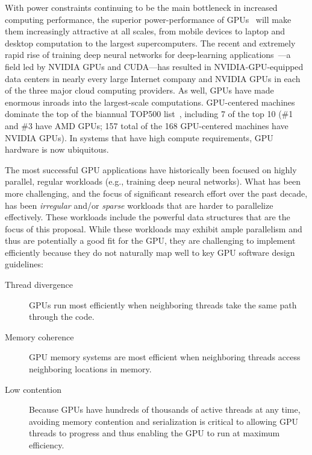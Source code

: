 With power constraints continuing to be the main bottleneck in increased computing performance, the superior power-performance of GPUs~\cite{Dally:2010:GCT} will make them increasingly attractive at all scales, from mobile devices to laptop and desktop computation to the largest supercomputers. The recent and extremely rapid rise of training deep neural networks for deep-learning applications~\cite{Amodei:2015:DS2,Chetlur:2014:CEP,Coates:2013:DLW,Hannun:2014:DSU}---a field led by NVIDIA GPUs and CUDA---has resulted in NVIDIA-GPU-equipped data centers in nearly every large Internet company and NVIDIA GPUs in each of the three major cloud computing providers. As well, GPUs have made enormous inroads into the largest-scale computations. GPU-centered machines dominate the top of the biannual TOP500 list~\cite{top500:nov2022}, including 7 of the top 10 (\#1 and \#3 have AMD GPUs; 157 total of the 168 GPU-centered machines have NVIDIA GPUs). In systems that have high compute requirements, GPU hardware is now ubiquitous.

The most successful GPU applications have historically been focused on highly parallel, regular workloads (e.g., training deep neural networks). What has been more challenging, and the focus of significant research effort over the past decade, has been \emph{irregular} and/or \emph{sparse} workloads that are harder to parallelize effectively. These workloads include the powerful data structures that are the focus of this proposal. While these workloads may exhibit ample parallelism and thus are potentially a good fit for the GPU, they are challenging to implement efficiently because they do not naturally map well to key GPU software design guidelines:

\begin{description}
  \item[Thread divergence] GPUs run most efficiently when neighboring threads take the same path through the code.
  \item[Memory coherence] GPU memory systems are most efficient when neighboring threads access neighboring locations in memory.
  \item[Low contention] Because GPUs have hundreds of thousands of active threads at any time, avoiding memory contention and serialization is critical to allowing GPU threads to progress and thus enabling the GPU to run at maximum efficiency.
\end{description}


